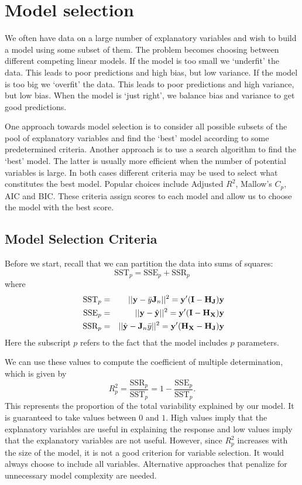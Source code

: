 \section{Model selection}

We often have data on a large number of explanatory variables and wish to build a model using some subset of them. 
The problem becomes choosing between different competing linear models. 
If the model is too small we `underfit' the data. This leads to poor predictions and high bias, but low variance.
If the model is too big we `overfit' the data. This leads to  poor predictions and high variance, but low bias.
When the model is `just right', we balance bias and variance to get good predictions.

One approach towards model selection is to consider all possible subsets of the pool of explanatory variables and find the `best' model according to some predetermined criteria.
Another approach is to use a search algorithm to find the `best' model. The latter is usually more efficient when the number of potential variables is large.
In both cases different criteria may be used to select what constitutes the best model. Popular choices include Adjusted $R^2$, Mallow's $C_p$, AIC and BIC. These criteria assign scores to each model and allow us to choose the model with the best score.


\subsection{Model Selection Criteria}


Before we start, recall that we can partition the data into sums of squares:
$$
\mbox{SST}_{p} = \mbox{SSE}_{p} + \mbox{SSR}_{p}
$$
where
\begin{eqnarray*}
\mbox{SST}_{p} &=& ||\mathbf{y} - \bar y {\bf J}_n ||^2 = \mathbf{y}' (\mathbf{I} - \mathbf{H}_{\bf J}) \mathbf{y} \\
\mbox{SSE}_{p} &=& ||\mathbf{y} - \hat {\mathbf{y}}||^2 = \mathbf{y}' (\mathbf{I} - \mathbf{H}_{\mathbf{X}}) \mathbf{y} \\\
\mbox{SSR}_{p} &=& ||\hat {\mathbf{y}} - \mathbf{J}_n \bar y||^2 = \mathbf{y}' (\mathbf{H}_{\mathbf{X}} - \mathbf{H}_{\mathbf{J}}) \mathbf{y} 
\end{eqnarray*}
Here the subscript $p$ refers to the fact that the model includes $p$ parameters.

We can use these values to compute the coefficient of multiple determination, which is given by
$$
R_p^2 = \frac{\mbox{SSR}_{p}}{\mbox{SST}_{p}} = 1- \frac{\mbox{SSE}_{p}}{\mbox{SST}_{p}}.
$$
This represents the proportion of the total variability explained by our model. 
It is guaranteed to take values between $0$ and $1$. High values imply that the explanatory variables are useful in explaining the response and low values imply that the explanatory variables are not useful.
However, since $R_p^2$ increases with the size of the model, it is not a good criterion for variable selection.
It would always choose to include all variables.
Alternative approaches that penalize for unnecessary model complexity are needed.


